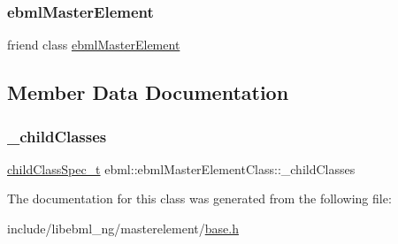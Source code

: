 \subsubsection{\texorpdfstring{ebml\+Master\+Element}{ebmlMasterElement}}
{\footnotesize\ttfamily friend class \mbox{\hyperlink{classebml_1_1ebmlMasterElement}{ebml\+Master\+Element}}\hspace{0.3cm}{\ttfamily [friend]}}



\subsection{Member Data Documentation}
\mbox{\label{classebml_1_1ebmlMasterElementClass_a2281bbfd89c6c3201c1b778efd428cb7}} 
\subsubsection{\texorpdfstring{\+\_\+child\+Classes}{\_childClasses}}
{\footnotesize\ttfamily \mbox{\hyperlink{classebml_1_1childClassSpec__t}{child\+Class\+Spec\+\_\+t}} ebml\+::ebml\+Master\+Element\+Class\+::\+\_\+child\+Classes\hspace{0.3cm}{\ttfamily [protected]}}



The documentation for this class was generated from the following file\+:\begin{DoxyCompactItemize}
\item 
include/libebml\+\_\+ng/masterelement/\mbox{\hyperlink{masterelement_2base_8h}{base.\+h}}\end{DoxyCompactItemize}
